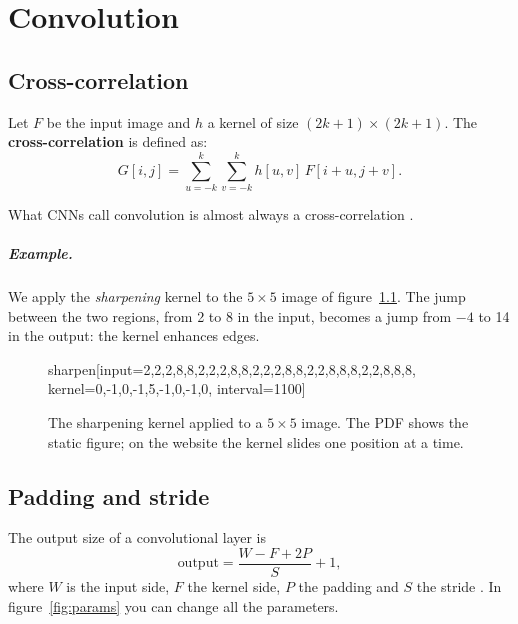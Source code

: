 \chapter{Convolution}\label{ch:conv}
\section{Cross-correlation}
Let $F$ be the input image and $h$ a kernel of size $(2k+1) \times (2k+1)$. The \textbf{cross-correlation} is defined as:
\[
G[i, j] = \sum_{u=-k}^{k}\sum_{v=-k}^{k} h[u, v]\, F[i + u, j + v].
\]

\begin{remark}
What CNNs call convolution is almost always a cross-correlation \cite[ch.~9]{Goodfellow-et-al-2016}.
\end{remark}

\paragraph{Example.}
We apply the \emph{sharpening} kernel to the $5 \times 5$ image of figure~\ref{fig:sharpen}. The jump between the two regions, from 2 to 8 in the input, becomes a jump from $-4$ to 14 in the output: the kernel enhances edges.

\begin{figure}[htbp]
\centering
\begin{widget}{sharpen}[input={{2,2,2,8,8},{2,2,2,8,8},{2,2,2,8,8},{2,2,8,8,8},{2,2,8,8,8}}, kernel={{0,-1,0},{-1,5,-1},{0,-1,0}}, interval=1100]
\end{widget}
\caption{The sharpening kernel applied to a $5 \times 5$ image. The PDF shows the static figure; on the website the kernel slides one position at a time.}
\label{fig:sharpen}
\end{figure}

\section{Padding and stride}
The output size of a convolutional layer is
\[
\text{output} = \frac{W - F + 2P}{S} + 1,
\]
where $W$ is the input side, $F$ the kernel side, $P$ the padding and $S$ the stride \cite{Dumoulin2016}. In figure~\ref{fig:params} you can change all the parameters.

